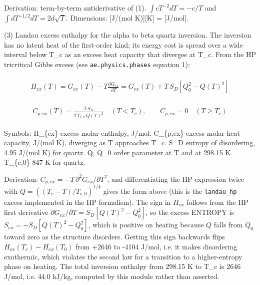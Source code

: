 \documentclass[10pt,a4paper,twoside]{report}
\begin{document}
Derivation: term-by-term antiderivative of (1). $\int c T^{-2} dT = -c/T$ and $\int d T^{-1/2} dT = 2 d \sqrt{T}$. Dimensions: [J/(mol K)][K] = [J/mol].

(3) Landau excess enthalpy for the alpha to beta quartz inversion. The inversion has no latent heat of the first-order kind; its energy cost is spread over a wide interval below T\_c as an excess heat capacity that diverges at T\_c. From the HP tricritical Gibbs excess (see \texttt{ae.physics.phases} equation 1):

\begin{equation*}
\begin{gathered}
\\ H_{ex}(T) = G_{ex}(T) - T \frac{\partial G_{ex}}{\partial T} = G_{ex}(T) + T\,S_D\left[Q_0^2 - Q(T)^2\right]
\end{gathered}
\end{equation*}

\begin{equation*}
\begin{gathered}
\\ C_{p,ex}(T) = \frac{T\,S_D}{2\,T_{c,0}\,Q(T)^2} \quad (T < T_c), \qquad C_{p,ex} = 0 \quad (T \ge T_c)
\end{gathered}
\end{equation*}

Symbols: H\_\{ex\}     excess molar enthalpy, J/mol. C\_\{p,ex\}   excess molar heat capacity, J/(mol K), diverging as T approaches T\_c. S\_D        entropy of disordering, 4.95 J/(mol K) for quartz. Q, Q\_0     order parameter at T and at 298.15 K. T\_\{c,0\}    847 K for quartz.

Derivation: $C_{p,ex} = -T\,\partial^2 G_{ex}/\partial T^2$, and differentiating the HP expression twice with $Q = ((T_c-T)/T_{c,0})^{1/4}$ gives the form above (this is the \texttt{landau\_hp} excess implemented in the HP formalism). The sign in $H_{ex}$ follows from the HP first derivative $\partial G_{ex}/\partial T = S_D\left[Q(T)^2 - Q_0^2\right]$, so the excess ENTROPY is $S_{ex} = -S_D\left[Q(T)^2 - Q_0^2\right]$, which is positive on heating because $Q$ falls from $Q_0$ toward zero as the structure disorders. Getting this sign backwards flips $H_{ex}(T_c) - H_{ex}(T_0)$ from +2646 to -4104 J/mol, i.e. it makes disordering exothermic, which violates the second law for a transition to a higher-entropy phase on heating. The total inversion enthalpy from 298.15 K to T\_c is 2646 J/mol, i.e. 44.0 kJ/kg, computed by this module rather than asserted.
\end{document}
